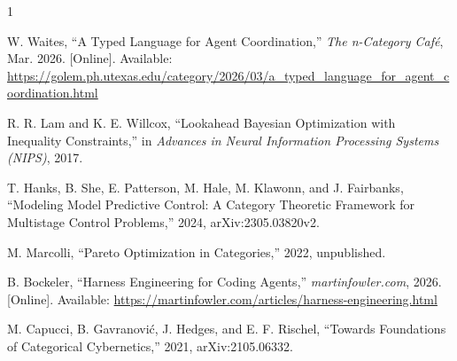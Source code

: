 \documentclass[journal]{IEEEtran}
\begin{document}
\begin{thebibliography}{1}

W. Waites, ``A Typed Language for Agent Coordination,'' \emph{The n-Category Caf\'{e}}, Mar. 2026. [Online]. Available: \url{https://golem.ph.utexas.edu/category/2026/03/a_typed_language_for_agent_coordination.html}

R. R. Lam and K. E. Willcox, ``Lookahead Bayesian Optimization with Inequality Constraints,'' in \emph{Advances in Neural Information Processing Systems (NIPS)}, 2017.

T. Hanks, B. She, E. Patterson, M. Hale, M. Klawonn, and J. Fairbanks, ``Modeling Model Predictive Control: A Category Theoretic Framework for Multistage Control Problems,'' 2024, arXiv:2305.03820v2.

M. Marcolli, ``Pareto Optimization in Categories,'' 2022, unpublished.

B. Bockeler, ``Harness Engineering for Coding Agents,'' \emph{martinfowler.com}, 2026. [Online]. Available: \url{https://martinfowler.com/articles/harness-engineering.html}

M. Capucci, B. Gavranovi\'{c}, J. Hedges, and E. F. Rischel, ``Towards Foundations of Categorical Cybernetics,'' 2021, arXiv:2105.06332.

\end{thebibliography}
\end{document}

